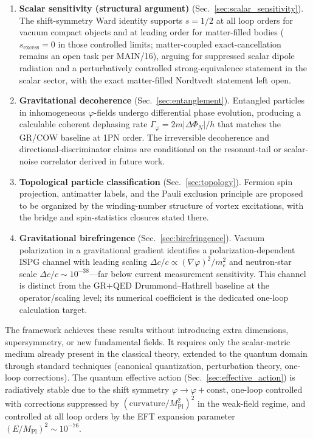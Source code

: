 \documentclass[aps,prd,onecolumn,superscriptaddress,nofootinbib,showpacs,12pt,notitlepage]{revtex4-2}
\newcommand{\Mpl}{M_{\mathrm{Pl}}}
\begin{document}
\begin{enumerate}
  \item \textbf{Scalar sensitivity (structural argument)}
    (Sec.~\ref{sec:scalar_sensitivity}).  The shift-symmetry
    Ward identity supports $s = 1/2$ at all loop orders for
    vacuum compact objects and at leading order for
    matter-filled bodies ($s_{\mathrm{excess}} = 0$ in those
    controlled limits; matter-coupled exact-cancellation
    remains an open task per MAIN/16), arguing for
    suppressed scalar dipole radiation and a perturbatively
    controlled strong-equivalence statement in the scalar
    sector, with the
    exact matter-filled Nordtvedt statement left open.

  \item \textbf{Gravitational decoherence}
    (Sec.~\ref{sec:entanglement}).  Entangled particles
    in inhomogeneous $\varphi$-fields undergo differential
    phase evolution, producing a calculable coherent
    dephasing rate $\Gamma_{\varphi} = 2m|\Delta\Phi_N|/h$
    that matches the GR/COW baseline at 1PN order.  The
    irreversible decoherence and directional-discriminator
    claims are conditional on the resonant-tail or scalar-noise
    correlator derived in future work.

  \item \textbf{Topological particle classification}
    (Sec.~\ref{sec:topology}).  Fermion spin projection,
    antimatter labels, and the Pauli exclusion principle
    are proposed to be organized by the winding-number
    structure of vortex excitations, with the bridge and
    spin-statistics closures stated there.

  \item \textbf{Gravitational birefringence}
    (Sec.~\ref{sec:birefringence}).  Vacuum polarization
    in a gravitational gradient identifies a
    polarization-dependent ISPG channel with leading scaling
    $\Delta c/c \propto(\nabla\varphi)^2/m_e^2$ and neutron-star
    scale $\Delta c/c \sim 10^{-38}$---far below current
    measurement sensitivity.  This channel is distinct from
    the GR$+$QED Drummond--Hathrell baseline at the
    operator/scaling level; its numerical coefficient is the
    dedicated one-loop calculation target.
\end{enumerate}

The framework achieves these results without introducing
extra dimensions, supersymmetry, or new fundamental
fields.  It requires only the scalar-metric medium
already present in the classical theory, extended to
the quantum domain through standard techniques (canonical
quantization, perturbation theory, one-loop corrections).
The quantum effective action
(Sec.~\ref{sec:effective_action}) is radiatively stable
due to the shift symmetry $\varphi \to \varphi + \mathrm{const}$,
one-loop controlled with corrections suppressed by
$(\mathrm{curvature}/\Mpl^2)^2$ in the weak-field
regime, and
controlled at all loop orders by the EFT expansion
parameter $(E/\Mpl)^2 \sim 10^{-76}$.
\end{document}
